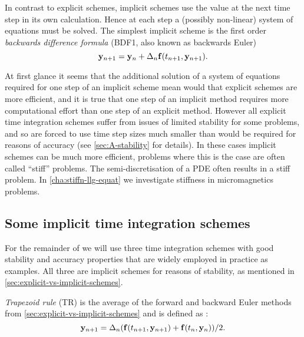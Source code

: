 In contrast to explicit schemes, implicit schemes use the value at the next time step in its own calculation.
Hence at each step a (possibly non-linear) system of equations must be solved.
The simplest implicit scheme is the first order \emph{backwards difference formula} (BDF1, also known as backwards Euler)
\begin{equation}
  \label{eq:bdf1-definition}
  \mathbf{y}_{n+1} = \mathbf{y}_n + \Delta_{n} {\mathbf{f}{\left( t_{n+1}, \mathbf{y}_{n+1} \right)}}.
\end{equation}

At first glance it seems that the additional solution of a system of equations required for one step of an implicit scheme mean would that explicit schemes are more efficient, and it is true that one step of an implicit method requires more computational effort than one step of an explicit method.
However all explicit time integration schemes suffer from issues of limited stability for some problems, and so are forced to use time step sizes much smaller than would be required for reasons of accuracy (see \cref{sec:A-stability} for details).
In these cases implicit schemes can be much more efficient, problems where this is the case are often called ``stiff'' problems.
The semi-discretisation of a PDE often results in a stiff problem.
In \cref{cha:stiffn-llg-equat} we investigate stiffness in micromagnetics problems.




\subsection{Some implicit time integration schemes}
\label{sec:some-implicit-time-integrators}

For the remainder of  we will use three time integration schemes with good stability and accuracy properties that are widely employed in practice as examples.
All three are implicit schemes for reasons of stability, as mentioned in \cref{sec:explicit-vs-implicit-schemes}.

\emph{Trapezoid rule} (TR) is the average of the forward and backward Euler methods from \cref{sec:explicit-vs-implicit-schemes} and is defined as \cite[260]{GreshoSani}:
\begin{equation}
  \mathbf{y}_{n+1} = \Delta_{n} ({\mathbf{f}{\left( t_{n+1}, \mathbf{y}_{n+1} \right)}} + {\mathbf{f}{\left( t_n, \mathbf{y}_n \right)}})/2.
  \label{eq:tr-definition}
\end{equation}

